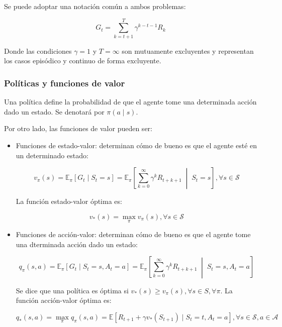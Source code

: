 \documentclass[11pt,a4paper]{article}
\begin{document}
		Se puede adoptar una notación común a ambos problemas:
		
		\begin{equation}
		G_t = \sum_{k=t+1}^{T} \gamma^{k-t-1} R_{k}
		\end{equation}
		
		Donde las condiciones $\gamma=1$ y $T=\infty$ son mutuamente excluyentes y representan los casos episódico y continuo de forma excluyente.
		
		\subsubsection{Políticas y funciones de valor}
		Una política define la probabilidad de que el agente tome una determinada acción dado un estado. Se denotará por $\pi(a \mid s)$. 
		
		Por otro lado, las funciones de valor pueden ser:
		
		\begin{itemize}
			\item Funciones de estado-valor: determinan cómo de bueno es que el agente esté en un determinado estado:
			
			\begin{equation}
			v_\pi(s) = \mathbb{E}_\pi[G_t \mid S_t = s] = \mathbb{E}_\pi \left[ \sum_{k=0}^\infty \gamma^k R_{t+k+1} \;\middle|\; S_t = s \right], \forall s \in \mathcal{S}
			\end{equation}
			
			La función estado-valor óptima es:
			
			\begin{equation}
			v_{*}(s) = \max_{\pi} v_\pi(s), \forall s \in \mathcal{S}
			\end{equation}
			
			\item Funciones de acción-valor: determinan cómo de bueno es que el agente tome una dterminada acción dado un estado:
			
			\begin{equation}
			q_\pi(s, a) = \mathbb{E}_\pi[G_t \mid S_t = s, A_t = a] = \mathbb{E}_\pi \left[ \sum_{k=0}^\infty \gamma^k R_{t+k+1} \;\middle|\; S_t = s, A_t = a \right]
			\end{equation}
			
			Se dice que una política es óptima si $v_*(s) \ge v_\pi(s), \forall s \in S, \forall \pi$. La función acción-valor óptima es:
			
			\begin{equation}
			q_{*}(s,a) = \max_{\pi} q_\pi(s,a) = \mathbb{E}\left[ R_{t+1} + \gamma v_{*}(S_{t+1}) \mid S_t = t, A_t = a \right], \forall s \in \mathcal{S}, a \in \mathcal{A}
			\end{equation}
		\end{itemize}
		
\end{document}

